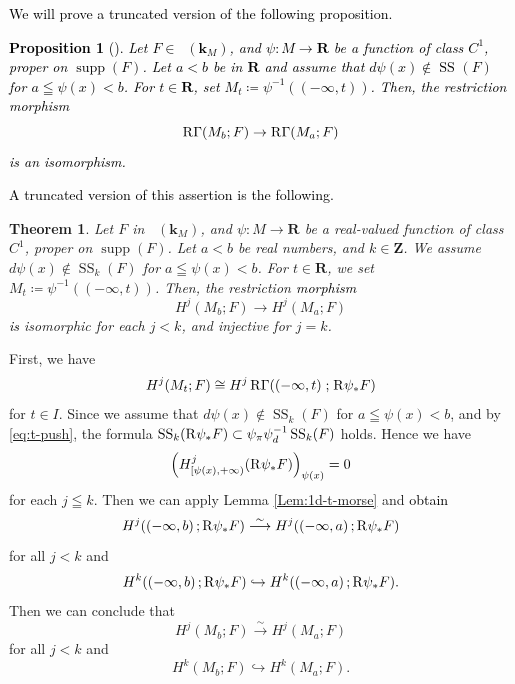 ﻿\documentclass[a4paper,leqno,dvipdfmx]{jsarticle}
\makeatletter
\newtheorem{Theorem+}[Axiom+]{Theorem}
\newtheorem{Proposition+}[Axiom+]{Proposition}
\theoremstyle{definition}
\newcommand{\zz}{\mathbf{Z}}
\newcommand{\rr}{\mathbf{R}}
\newcommand{\kk}{\mathbf{k}}
\renewenvironment{proof}[1][\proofname]{\par
  \pushQED{\qed}%
  \normalfont \topsep6\p@\@plus6\p@\relax
  \trivlist
  \item[\hskip\labelsep
         \bfseries
    {#1}]\ignorespaces
}{%
  \popQED\endtrivlist\@endpefalse
}
\renewcommand{\proofname}{Proof.}
\numberwithin{equation}{section}
\newcommand{\supp}{\mathop{\mathrm{supp}}\nolimits}
\newcommand{\Dompb}{\mathop{\mathsf{D}^\mathrm{b}}\nolimits}
\newcommand{\muS}[1][]{\mathop{\mathrm{SS}}\nolimits_{#1}}
\newcommand{\RG}{\mathop{\mathrm{R}\hspace{-0pt}\Gamma}\nolimits}
\newcommand{\Rder}[1][]{\mathop{\mathrm{R}^{#1}\hspace{-2pt}}\nolimits}
\newcommand{\simarr}{\mathrel{\overset{\sim}{\longrightarrow}}}%
\theoremstyle{mystyle}
\newcommand{\mpb}[1][]{{#1}_{\pi}} %
\newcommand{\mdiff}[1][]{{#1}_{d}} %
\makeatother
\begin{document}
\textcolor{black}{We will prove a truncated version of the following proposition.
\begin{Proposition+}[{\cite[Proposition 1.8]{GKS12}}]\label{prp:mu-morse}
    Let \(F \in \Dompb(\kk_M)\), and 
  \(\psi\colon M\to \rr\) be a function of 
  class \(C^1\), 
  proper on \(\supp(F)\). 
  Let \(a<b\) be in \(\rr\) and 
  assume that \(d\psi(x)\notin \muS[](F)\) for \(
    a\leqq \psi(x)<b
  \). For \(t\in \rr\), set \(
    M_t\coloneqq\psi^{-1}\left((-\infty,t)\right)
  \). 
  Then, the restriction morphism \[
    \RG(M_{b};F)\to \RG(M_{a};F)
  \]
  is an isomorphism.
\end{Proposition+}
A truncated version of this assertion is the following.}

\begin{Theorem+}\label{thm:t-morse}
  Let \(F\) in \(\Dompb(\kk_M)\), and 
  \(\psi\colon M\to \rr\) be a real-valued function of 
  class \(C^1\), 
  proper on \(\supp(F)\). 
  Let \(a<b\) be real numbers, and \(k\in\zz\).
  We assume \(d\psi(x)\notin \muS[k](F)\) for \(
    a\leqq \psi(x)<b
  \). For \(t\in \rr\), we set \(
    M_t\coloneqq\psi^{-1}\left((-\infty,t)\right)
  \). 
  Then, the restriction \textcolor{black}{morphism} \[
    H^{j}(M_{b};F)\to H^{j}(M_{a};F)
  \]
  \textcolor{black}{is} isomorphic for each \(j< k\), and 
  injective for \(j=k\).
\end{Theorem+}

\begin{proof}
  First, we have\[
    H^{j}(M_{t};F)
    \cong
    H^{j}\RG(
      {\left(-\infty,t\right)}\mathrel{;}\Rder{\psi}_{\ast}F
    )
  \]
  for \(t\in I\).
  Since we assume that \(d\psi(x)\notin \muS[k](F)\) 
  for \(a\leqq \psi(x)<b\), and by \eqref{eq:t-push}, 
  the formula \(
    \muS[k](\Rder{\psi}_{\ast}F)
    \subset \mpb[\psi]\mdiff[\psi]^{-1}\muS[k](F)
  \) holds. Hence we have\[
    \left(H^{j}_{\left[\psi(x),+\infty\right)}(\Rder{\psi}_{\ast}F)\right)_{\psi(x)}=0
  \]for each \(j\leqq k\). 
  Then we can apply Lemma \ref{Lem:1d-t-morse} and \textcolor{black}{obtain}
  \[
    H^{j}(\left(-\infty,b\right);\Rder{\psi_{\ast}}F)
    \simarr
    H^{j}(\left(-\infty,a\right);\Rder{\psi_{\ast}}F)
  \] for all \(j<k\) and
  \[
    H^{k}(\left(-\infty,b\right);\Rder{\psi_{\ast}}F)
    \hookrightarrow
    H^{k}(\left(-\infty,a\right);\Rder{\psi_{\ast}}F).
  \] Then we can conclude that
  \[
    H^{j}(M_b\mathrel{;}F)
    \simarr
    H^{j}(M_a\mathrel{;}F)
  \]
  for all \(j<k\) and 
  \[
    H^{k}(M_b\mathrel{;}F)
    \hookrightarrow
    H^{k}(M_a\mathrel{;}F).
  \]
\end{proof}
\end{document}

